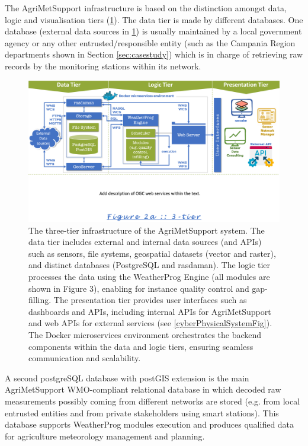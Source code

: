 \documentclass[authoryear,preprint,review,12pt]{elsarticle}
\begin{document}
The AgriMetSupport infrastructure is based on the distinction amongst data, logic and visualisation tiers (\cref{Fig_tiers}).
The data tier is made by different data\-bases.
One database (external data sources in \cref{Fig_tiers}) is usually maintained by a local government agency or any other entrusted/responsible entity (such as the Campania Region departments shown in Section \ref{sec:casestudy}) which is in charge of retrieving raw records by the monitoring stations within its network.
\begin{figure}[!t] %
	\centering %
	\includegraphics[angle=0,scale=.4,trim=0cm 6.2cm 0cm 0cm,clip]{Fig02_Tiers.png}
	\caption{The three-tier infrastructure of the AgriMetSupport system. The data tier includes external and internal data sources (and APIs) such as sensors, file systems, geospatial datasets (vector and raster), and distinct databases (PostgreSQL and rasdaman). The logic tier processes the data using the WeatherProg Engine (all modules are shown in Figure 3), enabling for instance quality control and gap-filling. The presentation tier provides user interfaces such as dashboards and APIs, including internal APIs for Agri\-Met\-Support and web APIs for external services (see \cref{cyberPhysicalSystemFig}). The Docker microservices environment orchestrates the backend components within the data and logic tiers, ensuring seamless communication and scalability.}
	\label{Fig_tiers}
\end{figure}
A second postgreSQL database with postGIS extension is the main Agri\-Met\-Support WMO-compliant relational database  in which decoded raw measurements possibly coming from different networks are stored (e.g. from local entrusted entities and from private stakeholders using smart stations).
This database supports WeatherProg modules execution and produces qualified data for agriculture meteorology management and planning.
\end{document}
